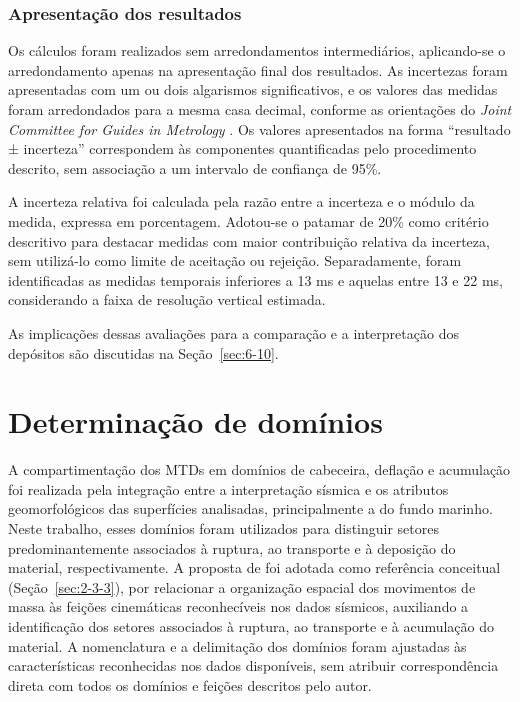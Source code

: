 \subsubsection{Apresentação dos resultados}\label{sec:4-3-9-5}

Os cálculos foram realizados sem arredondamentos intermediários, aplicando-se o arredondamento apenas na apresentação final dos resultados. As incertezas foram apresentadas com um ou dois algarismos significativos, e os valores das medidas foram arredondados para a mesma casa decimal, conforme as orientações do \textit{Joint Committee for Guides in Metrology} \cite{jcgm2008}. Os valores apresentados na forma “resultado ± incerteza” correspondem às componentes quantificadas pelo procedimento descrito, sem associação a um intervalo de confiança de 95\%.

A incerteza relativa foi calculada pela razão entre a incerteza e o módulo da medida, expressa em porcentagem. Adotou-se o patamar de 20\% como critério descritivo para destacar medidas com maior contribuição relativa da incerteza, sem utilizá-lo como limite de aceitação ou rejeição. Separadamente, foram identificadas as medidas temporais inferiores a 13 ms e aquelas entre 13 e 22 ms, considerando a faixa de resolução vertical estimada.

As implicações dessas avaliações para a comparação e a interpretação dos depósitos são discutidas na Seção~\ref{sec:6-10}.

\section{Determinação de domínios}\label{sec:4-4}

A compartimentação dos MTDs em domínios de cabeceira, deflação e acumulação foi realizada pela integração entre a interpretação sísmica e os atributos geomorfológicos das superfícies analisadas, principalmente a do fundo marinho. Neste trabalho, esses domínios foram utilizados para distinguir setores predominantemente associados à ruptura, ao transporte e à deposição do material, respectivamente. A proposta de  foi adotada como referência conceitual (Seção~\ref{sec:2-3-3}), por relacionar a organização espacial dos movimentos de massa às feições cinemáticas reconhecíveis nos dados sísmicos, auxiliando a identificação dos setores associados à ruptura, ao transporte e à acumulação do material. A nomenclatura e a delimitação dos domínios foram ajustadas às características reconhecidas nos dados disponíveis, sem atribuir correspondência direta com todos os domínios e feições descritos pelo autor.


